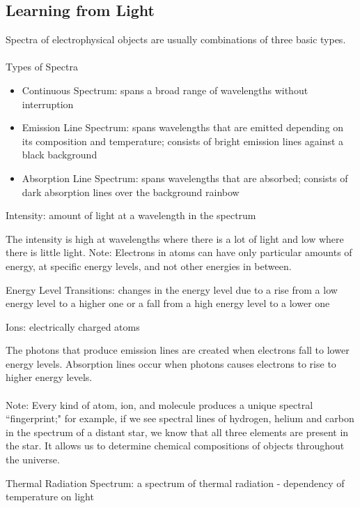 \documentclass[12pt]{article}
\begin{document}
\subsection{Learning from Light} 
Spectra of electrophysical objects are usually combinations of three basic types. \\~\\
Types of Spectra \begin{itemize} 
\item Continuous Spectrum: spans a broad range of wavelengths without interruption 
\item Emission Line Spectrum: spans wavelengths that are emitted depending on its composition and temperature; consists of bright emission lines against a black background
\item Absorption Line Spectrum: spans wavelengths that are absorbed; consists of dark absorption lines over the background rainbow \end{itemize} 
\begin{definition} Intensity: amount of light at a wavelength in the spectrum \end{definition}
The intensity is high at wavelengths where there is a lot of light and low where there is little light. 
Note: Electrons in atoms can have only particular amounts of energy, at specific energy levels, and not other energies in between. 
\begin{definition} Energy Level Transitions: changes in the energy level due to a rise from a low energy level to a higher one or a fall from a high energy level to a lower one \end{definition}
\begin{definition} Ions: electrically charged atoms \end{definition}
The photons that produce emission lines are created when electrons fall to lower energy levels. Absorption lines occur when photons causes electrons to rise to higher energy levels. \\~\\
Note: Every kind of atom, ion, and molecule produces a unique spectral ``fingerprint;" for example, if we see spectral lines of hydrogen, helium and carbon in the spectrum of a distant star, we know that all three elements are present in the star. It allows us to determine chemical compositions of objects throughout the universe.
\begin{definition} Thermal Radiation Spectrum: a spectrum of thermal radiation - dependency of temperature on light \end{definition}
\end{document}

